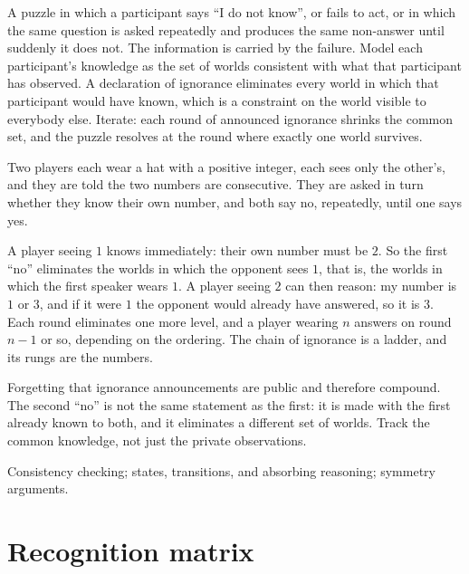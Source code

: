 \cue A puzzle in which a participant says ``I do not know'', or fails to act, or in which the same question is asked repeatedly and produces the same non-answer until suddenly it does not. The information is carried by the failure.
\method Model each participant's knowledge as the set of worlds consistent with what that participant has observed. A declaration of ignorance eliminates every world in which that participant would have known, which is a constraint on the world visible to everybody else. Iterate: each round of announced ignorance shrinks the common set, and the puzzle resolves at the round where exactly one world survives.

\begin{worked}
Two players each wear a hat with a positive integer, each sees only the other's, and they are told the two numbers are consecutive. They are asked in turn whether they know their own number, and both say no, repeatedly, until one says yes.

A player seeing $1$ knows immediately: their own number must be $2$. So the first ``no'' eliminates the worlds in which the opponent sees $1$, that is, the worlds in which the first speaker wears $1$. A player seeing $2$ can then reason: my number is $1$ or $3$, and if it were $1$ the opponent would already have answered, so it is $3$. Each round eliminates one more level, and a player wearing $n$ answers on round $n-1$ or so, depending on the ordering. The chain of ignorance is a ladder, and its rungs are the numbers.
\end{worked}

\begin{trap}
Forgetting that ignorance announcements are public and therefore compound. The second ``no'' is not the same statement as the first: it is made with the first already known to both, and it eliminates a different set of worlds. Track the common knowledge, not just the private observations.
\end{trap}

\begin{seealsob}Consistency checking; states, transitions, and absorbing reasoning; symmetry arguments.\end{seealsob}

\section{Recognition matrix}

